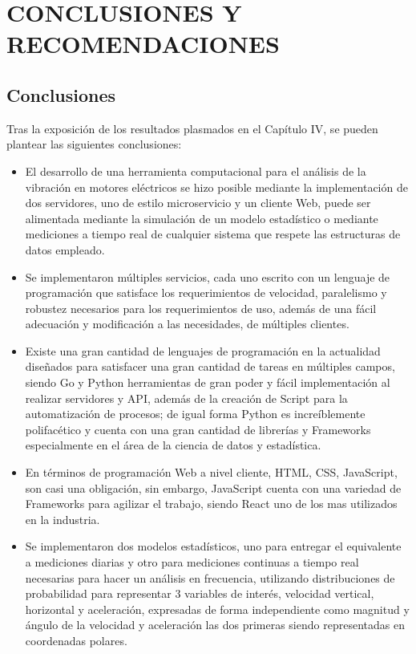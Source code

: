 \thispagestyle{empty}

\section*{CONCLUSIONES Y RECOMENDACIONES}
\subsection{Conclusiones}
Tras la exposición de los resultados plasmados en el Capítulo IV, se pueden
plantear las siguientes conclusiones:

\begin{itemize}
    \item El desarrollo  de una herramienta computacional para el análisis de
        la vibración en motores eléctricos se hizo posible mediante la
        implementación de dos servidores, uno de estilo
        microservicio y un cliente Web, puede ser alimentada mediante la
        simulación de un  modelo estadístico o
        mediante mediciones a tiempo real de cualquier sistema
        que respete las estructuras de datos empleado.
    \item Se implementaron múltiples servicios, cada uno escrito con un
        lenguaje de programación que satisface los requerimientos de velocidad,
        paralelismo y robustez necesarios para  los requerimientos de
        uso, además de una fácil adecuación y modificación a las necesidades,
        de múltiples clientes.
    \item Existe una gran cantidad de lenguajes de programación en la actualidad
        diseñados para satisfacer una gran cantidad de tareas en múltiples campos,
        siendo Go y Python herramientas de gran poder y fácil implementación
        al realizar servidores y API, además de la creación de Script
        para la automatización de procesos; de igual forma Python es increíblemente
        polifacético y cuenta con una gran cantidad de librerías y Frameworks
        especialmente en el área de la ciencia de datos y estadística.
    \item En términos de programación Web a nivel cliente,
        HTML, CSS, JavaScript, son casi una obligación, sin embargo,
        JavaScript cuenta con una  variedad de Frameworks para agilizar el
        trabajo, siendo React uno
        de los mas utilizados en la industria.
    \item Se implementaron dos modelos estadísticos, uno para entregar el
        equivalente a mediciones diarias y otro para mediciones continuas a tiempo
        real necesarias para hacer un análisis en frecuencia,
        utilizando distribuciones de probabilidad para representar 3 variables de interés,
        velocidad vertical, horizontal y aceleración, expresadas de forma independiente
        como magnitud y ángulo de la velocidad y aceleración las dos primeras
        siendo representadas en coordenadas polares.


\end{itemize}
